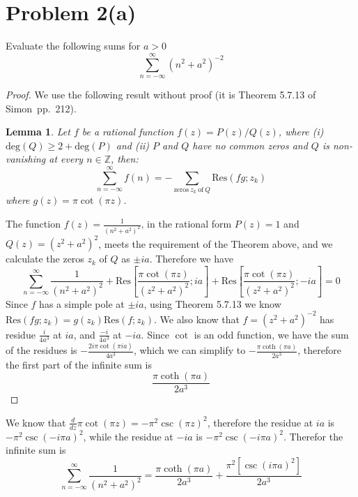 \documentclass{article}[12pt]
\newtheorem{lem}{Lemma}
\def\ZZ{{\mathbb Z}}
\begin{document}
\section*{Problem 2(a)} Evaluate the following sums for $a>0$
\[
\sum_{n=-\infty}^\infty (n^2+a^2)^{-2}
\]
\begin{proof}
We use the following result without proof (it is Theorem 5.7.13
of Simon~pp.~212).
\begin{lem}
Let $f$ be a rational function $f(z)=P(z)/Q(z)$, where
(i) $\mbox{deg}(Q) \ge 2+\mbox{deg}(P)$ and (ii) $P$ and $Q$
have no common zeros and $Q$ is non-vanishing at every $n\in\ZZ$,
then:
\[
\sum_{n=-\infty}^\infty f(n) = 
- \sum_{\mbox{zeros}\ z_k\ \mbox{of}\ Q} \mbox{Res}(fg;z_k)
\]
where $g(z)=\pi \cot(\pi z)$.
\end{lem}
The function $f(z)=\frac{1}{(n^2+a^2)^2}$, in the rational form $P(z)=1$
and $Q(z)=(z^2+a^2)^2$, meets the requirement of the Theorem above, and
we calculate the zeros $z_k$ of $Q$ as $\pm ia$. Therefore we have
\[
\sum_{n=-\infty}^\infty \frac{1}{(n^2+a^2)^2} + 
\mbox{Res}\left[\frac{\pi \cot(\pi z)}{(z^2+a^2)^2}; ia\right] +
\mbox{Res}\left[\frac{\pi \cot(\pi z)}{(z^2+a^2)^2}; -ia\right] = 0
\]
Since $f$ has a simple pole at $\pm ia$, using Theorem 5.7.13
we know $\mbox{Res}(fg;z_k)=g(z_k)\mbox{Res}(f;z_k)$.
We also know that $f=(z^2+a^2)^{-2}$ has residue 
$\frac{i}{4a^3}$ at $ia$, and $\frac{-i}{4a^3}$ at $-ia$.
Since $\cot$ is an odd function, we have the sum of the residues
is $-\frac{2i\pi\cot(\pi ia)}{4a^3}$, which we can simplify to
$-\frac{\pi\coth(\pi a)}{2a^3}$, therefore the first part of the infinite sum is
\[
\frac{\pi\coth(\pi a)}{2a^3}
\]
\end{proof}
We know that $\frac{d}{dz} \pi \cot(\pi z) = -\pi^2\csc(\pi z)^2$, therefore
the residue at $ia$ is $-\pi^2\csc(-i\pi a)^2$, while the residue at $-ia$
is $-\pi^2\csc(-i\pi a)^2$. Therefor the infinite sum is
\[
\sum_{n=-\infty}^\infty \frac{1}{(n^2+a^2)^2} = \frac{\pi\coth(\pi a)}{2a^3}+
\frac{\pi^2[\csc(i\pi a)^2]}{2a^3}
\]
\end{document}
